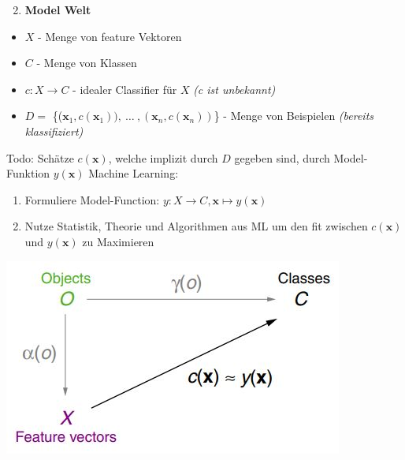 \documentclass[11pt,a4paper]{article}
\begin{document}
\begin{flushleft}
    \begin{enumerate}
        \setcounter{enumi}{1}
        \item \textbf{Model Welt}
    \end{enumerate}
     \begin{itemize}
         \item $X$ - Menge von feature Vektoren
         \item $C$ - Menge von Klassen
         \item $c: X \rightarrow C$ - idealer Classifier für $X$ \textit{(c ist unbekannt)}
         \item $ D =$ \{($\textbf{x}_1,c(\textbf{x}_1)),\ \dots\ ,(\textbf{x}_n, c( \textbf{x}_n)) $\} - Menge von Beispielen \textit{(bereits klassifiziert)}
     \end{itemize}
    Todo: Schätze $c(\mathbf{x})$, welche implizit durch $D$ gegeben sind, durch
    \newline \quad Model-Funktion $y(\mathbf{x})$ 
    \newline\newline
    Machine Learning: \newline
    \begin{enumerate}
        \item Formuliere Model-Function: $y: X \rightarrow C, \mathbf{x} \mapsto y(\mathbf{x})$
        \item Nutze Statistik, Theorie und Algorithmen aus ML um den fit zwischen $c(\mathbf{x})$ und $y(\mathbf{x})$ zu Maximieren
    \end{enumerate}
    \includegraphics[width=\textwidth]{modelworld}
    

\end{flushleft}
\end{document}
